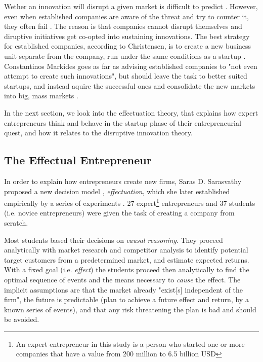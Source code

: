 \documentclass[a4paper,10pt]{article}
\begin{document}
Wether an innovation will disrupt a given market is difficult to predict \cite{innovatorsSolution}. 
However, even when established companies are aware of the threat and try to counter it, they often fail \cite{innovatorsSolution}. 
The reason is that companies cannot disrupt themselves \cite{innovatorsSolution} and diruptive initiatives get co-opted into sustaining innovations. 
The best strategy for established companies, according to Christensen, 
is to create a new business unit separate from the company, run under the same conditions as a startup \cite{innovatorsSolution}. 
Constantinos Markides goes as far as advising established companies to "not even attempt to create such innovations", but should leave the task 
to better suited startups, and instead aquire the successful ones and consolidate the new markets into big, mass markets \cite{scientificArticleDisruptiveInnovationBetterTheory}.


In the next section, we look into the effectuation theory, that explains how expert entrepreneurs think and behave in the startup phase of their entrepreneurial quest,
and how it relates to the disruptive innovation theory.


\newpage

\subsection{The Effectual Entrepreneur}
In order to explain how entrepreneurs create new firms, Saras D. Sarasvathy proposed a new decision model \cite{effectuationProposal}, \emph{effectuation}, 
which she later established empirically by a series of experiments \cite{effectuationExperiment}.
27 expert\footnote{An expert entrepreneur in this study is a person who started one or more companies that have a value from 200 million to 6.5 billion USD}
entrepreneurs and 37 students (i.e. novice entrepreneurs) were given the task of creating a company from scratch.

Most students based their decisions on \emph{causal reasoning}. They proceed analytically with market research and competitor analysis 
to identify potential target customers from a predetermined market, and estimate expected returns. With a fixed goal (i.e. \emph{effect}) the students proceed then 
analytically to find the optimal sequence of events and the means necessary to \emph{cause} the effect. 
The implicit assumptions are that the market already "exist[s] independent of the firm", the future is predictable 
(plan to achieve a future effect and return, by a known series of events), and that any risk threatening the plan is bad and should be avoided.
\end{document}
